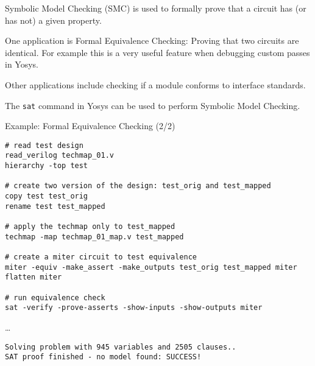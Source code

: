 \begin{frame}
\subsectionpage
\subsectionpagesuffix
\end{frame}

\begin{frame}{\subsecname}
Symbolic Model Checking (SMC) is used to formally prove that a circuit has
(or has not) a given property.

\bigskip
One application is Formal Equivalence Checking: Proving that two circuits
are identical. For example this is a very useful feature when debugging custom
passes in Yosys.

\bigskip
Other applications include checking if a module conforms to interface
standards.

\bigskip
The {\tt sat} command in Yosys can be used to perform Symbolic Model Checking.
\end{frame}


\begin{frame}[t, fragile]{Example: Formal Equivalence Checking (2/2)}
\begin{lstlisting}[basicstyle=\ttfamily\fontsize{8pt}{10pt}\selectfont, language=ys, frame=single]
# read test design
read_verilog techmap_01.v
hierarchy -top test

# create two version of the design: test_orig and test_mapped
copy test test_orig
rename test test_mapped

# apply the techmap only to test_mapped
techmap -map techmap_01_map.v test_mapped

# create a miter circuit to test equivalence
miter -equiv -make_assert -make_outputs test_orig test_mapped miter
flatten miter

# run equivalence check
sat -verify -prove-asserts -show-inputs -show-outputs miter
\end{lstlisting}

\dots
\begin{lstlisting}[basicstyle=\ttfamily\fontsize{8pt}{10pt}\selectfont]
Solving problem with 945 variables and 2505 clauses..
SAT proof finished - no model found: SUCCESS!
\end{lstlisting}
\end{frame}

